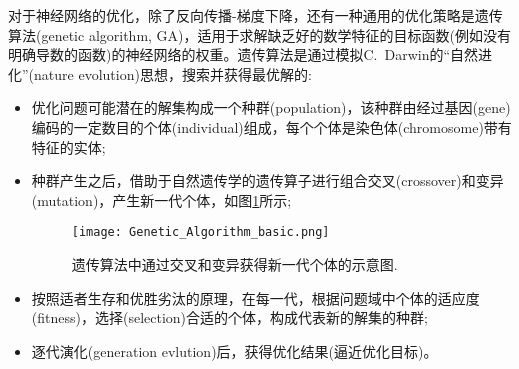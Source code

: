 \documentclass[10pt, oneside, a4paper]{article}      %
\begin{document}
对于神经网络的优化，除了反向传播-梯度下降，还有一种通用的优化策略是遗传算法\textrm{(genetic algorithm, GA)}，适用于求解缺乏好的数学特征的目标函数(例如没有明确导数的函数)的神经网络的权重。遗传算法是通过模拟\textrm{C.~Darwin}的“自然进化”(\textrm{nature evolution})思想，搜索并获得最优解的:~
	\begin{itemize}
		\item 优化问题可能潜在的解集构成一个种群(\textrm{population})，该种群由经过基因(\textrm{gene})编码的一定数目的个体(\textrm{individual})组成，每个个体是染色体(\textrm{chromosome})带有特征的实体;
		\item 种群产生之后，借助于自然遗传学的遗传算子进行组合交叉(\textrm{crossover})和变异(\textrm{mutation})，产生新一代个体，如图\ref{Optimize_GA}所示;
\begin{figure}[h!]
\vspace*{-0.10in}
\centering
\texttt{[image: Genetic\_Algorithm\_basic.png]}
\caption{遗传算法中通过交叉和变异获得新一代个体的示意图.}%
\label{Optimize_GA}
\end{figure}
		\item 按照适者生存和优胜劣汰的原理，在每一代，根据问题域中个体的适应度(\textrm{fitness})，选择(\textrm{selection})合适的个体，构成代表新的解集的种群;
		\item 逐代演化(\textrm{generation evlution})后，获得优化结果(逼近优化目标)。
	\end{itemize}
\end{document}
